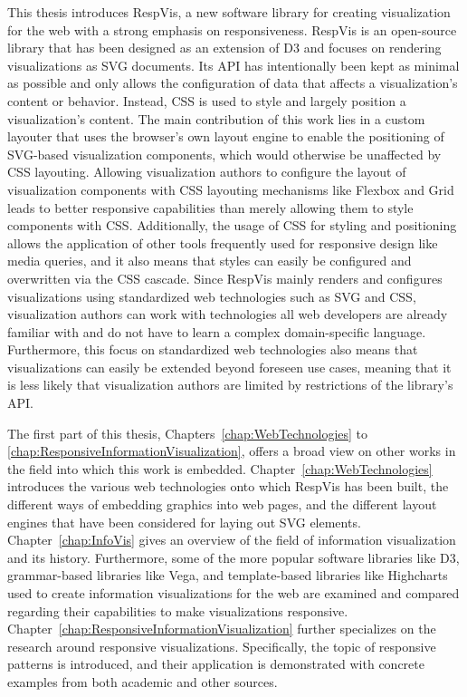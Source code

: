 This thesis introduces RespVis, a new software library for creating visualization for the web with a strong emphasis on responsiveness.
RespVis is an open-source library \parencite{RespVisGitHub} that has been designed as an extension of D3 and focuses on rendering visualizations as SVG documents.
Its API has intentionally been kept as minimal as possible and only allows the configuration of data that affects a visualization's content or behavior.
Instead, CSS is used to style and largely position a visualization's content.
The main contribution of this work lies in a custom layouter that uses the browser's own layout engine to enable the positioning of SVG-based visualization components, which would otherwise be unaffected by CSS layouting.
Allowing visualization authors to configure the layout of visualization components with CSS layouting mechanisms like Flexbox and Grid leads to better responsive capabilities than merely allowing them to style components with CSS.
Additionally, the usage of CSS for styling and positioning allows the application of other tools frequently used for responsive design like media queries, and it also means that styles can easily be configured and overwritten via the CSS cascade.
Since RespVis mainly renders and configures visualizations using standardized web technologies such as SVG and CSS, visualization authors can work with technologies all web developers are already familiar with and do not have to learn a complex domain-specific language.
Furthermore, this focus on standardized web technologies also means that visualizations can easily be extended beyond foreseen use cases, meaning that it is less likely that visualization authors are limited by restrictions of the library's API. 

The first part of this thesis, Chapters~\ref{chap:WebTechnologies} to \ref{chap:ResponsiveInformationVisualization}, offers a broad view on other works in the field into which this work is embedded. Chapter~\ref{chap:WebTechnologies} introduces the various web technologies onto which RespVis has been built, the different ways of embedding graphics into web pages, and the different layout engines that have been considered for laying out SVG elements.
Chapter~\ref{chap:InfoVis} gives an overview of the field of information visualization and its history.
Furthermore, some of the more popular software libraries like D3, grammar-based libraries like Vega, and template-based libraries like Highcharts used to create information visualizations for the web are examined and compared regarding their capabilities to make visualizations responsive.
Chapter~\ref{chap:ResponsiveInformationVisualization} further specializes on the research around responsive visualizations.
Specifically, the topic of responsive patterns is introduced, and their application is demonstrated with concrete examples from both academic and other sources. 


